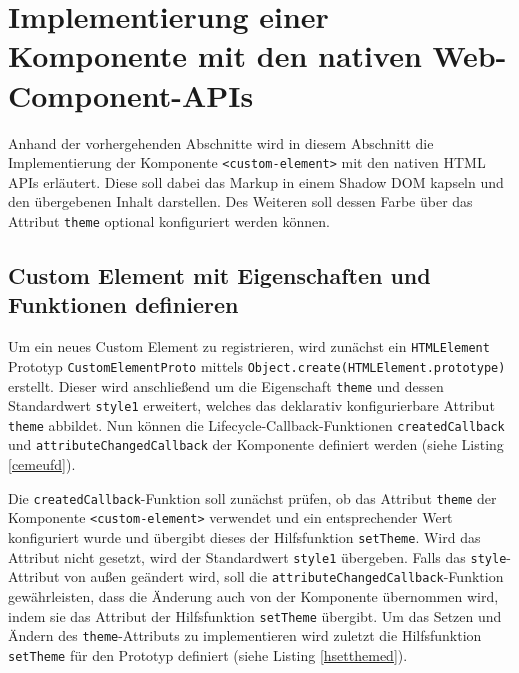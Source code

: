 \section{Implementierung einer Komponente mit den nativen Web-Component-APIs}\label{implementierung-einer-komponente-mit-den-nativen-web-component-apis}

Anhand der vorhergehenden Abschnitte wird in diesem Abschnitt die Implementierung der Komponente \texttt{\textless{}custom-element\textgreater{}} mit den nativen \ac{HTML} APIs erläutert. Diese soll dabei das Markup in einem Shadow \ac{DOM} kapseln und den übergebenen Inhalt darstellen. Des Weiteren soll dessen Farbe über das Attribut \texttt{theme} optional konfiguriert werden können.


\subsection{Custom Element mit Eigenschaften und Funktionen definieren}\label{custom-element-mit-eigenschaften-und-funktionen-definieren}

Um ein neues Custom Element zu registrieren, wird zunächst ein \texttt{\ac{HTML}Element} Prototyp \texttt{CustomElementProto} mittels \texttt{Object.create(\ac{HTML}Element.prototype)} erstellt. Dieser wird anschließend um die Eigenschaft \texttt{theme} und dessen Standardwert \texttt{style1} erweitert, welches das deklarativ konfigurierbare
Attribut \texttt{theme} abbildet. Nun können die Lifecycle-Callback-Funktionen \texttt{createdCallback} und \texttt{attributeChangedCallback} der Komponente definiert werden (siehe Listing \ref{cemeufd}).



Die \texttt{createdCallback}-Funktion soll zunächst prüfen, ob das Attribut \texttt{theme} der Komponente
\texttt{\textless{}custom-element\textgreater{}} verwendet und ein entsprechender Wert konfiguriert wurde und übergibt dieses der Hilfsfunktion \texttt{setTheme}. Wird das Attribut nicht gesetzt, wird der Standardwert \texttt{style1} übergeben. Falls das \texttt{style}-Attribut von außen geändert wird, soll die \texttt{attributeChangedCallback}-Funktion gewährleisten, dass die Änderung auch von der Komponente übernommen wird, indem sie das Attribut der Hilfsfunktion \texttt{setTheme} übergibt. Um das Setzen und Ändern des \texttt{theme}-Attributs zu implementieren wird zuletzt die Hilfsfunktion \texttt{setTheme} für den Prototyp definiert (siehe Listing \ref{hsetthemed}).

